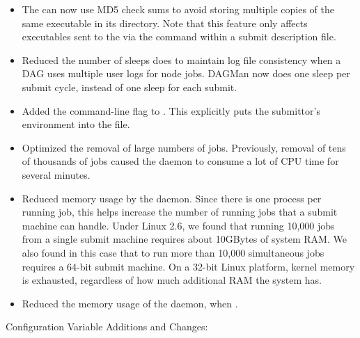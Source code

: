 \begin{itemize}
\item The  can now use MD5 check sums to avoid storing
multiple copies of the same executable in its  directory.
Note that this feature only affects executables sent to the
 via the  command within
a submit description file.

\item Reduced the number of sleeps  does to maintain log
file consistency when a DAG uses multiple user logs for node jobs.
DAGMan now does one sleep per submit cycle,
instead of one sleep for each submit.

\item Added the  command-line flag to
.  This explicitly puts the submittor's environment
into the  file.

\item Optimized the removal of large numbers of jobs.  
Previously, removal of tens of thousands of jobs caused the
 daemon to consume
a lot of CPU time for several minutes.

\item Reduced memory usage by the  daemon.  Since there is one
 process per running job, this helps increase the
number of running jobs that a submit machine can handle.  Under Linux 2.6,
we found that running 10,000 jobs from a single submit machine
requires about 10GBytes of system RAM.  We also found in this case that to
run more than 10,000 simultaneous jobs requires a 64-bit submit
machine.  On a 32-bit Linux platform, kernel memory is exhausted,
regardless of how much additional RAM the system has.

\item Reduced the memory usage of the  daemon,
when .

\end{itemize}

\noindent Configuration Variable Additions and Changes:

